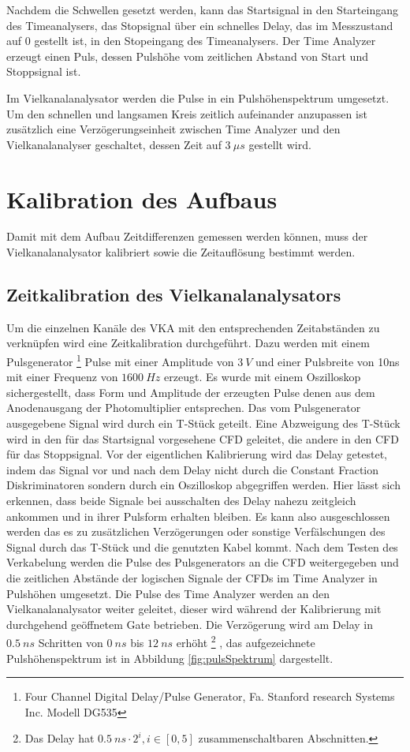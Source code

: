 \documentclass[a4paper,12pt]{article}
\begin{document}
Nachdem die Schwellen gesetzt werden, kann das Startsignal in den Starteingang des Timeanalysers, das Stopsignal über ein schnelles Delay, das im Messzustand auf 0 gestellt ist, in den Stopeingang des Timeanalysers.
Der Time Analyzer erzeugt einen Puls, dessen Pulshöhe vom zeitlichen Abstand von Start und Stoppsignal ist.

Im Vielkanalanalysator werden die Pulse in ein Pulshöhenspektrum umgesetzt.
Um den schnellen und langsamen Kreis zeitlich aufeinander 
anzupassen ist zusätzlich eine Verzögerungseinheit zwischen Time Analyzer und den Vielkanalanalyser geschaltet, dessen Zeit auf $\SI{3}{μs}$ gestellt wird.

\section{Kalibration des Aufbaus}
Damit mit dem Aufbau Zeitdifferenzen gemessen werden können, muss der Vielkanalanalysator kalibriert
sowie die Zeitauflösung bestimmt werden.
\subsection{Zeitkalibration des Vielkanalanalysators}
Um die einzelnen Kanäle des VKA mit den entsprechenden Zeitabständen zu verknüpfen wird eine Zeitkalibration durchgeführt. Dazu werden
mit einem Pulsgenerator
\footnote{Four Channel Digital Delay/Pulse Generator, Fa. Stanford research Systems Inc. Modell DG535}
Pulse mit einer Amplitude von $\SI{3}{V}$ und einer Pulsbreite von 10ns mit
einer Frequenz von $\SI{1600}{Hz}$ erzeugt.
Es wurde mit einem Oszilloskop sichergestellt, dass Form und Amplitude der erzeugten Pulse denen aus dem Anodenausgang der Photomultiplier
entsprechen. Das vom Pulsgenerator ausgegebene Signal wird durch ein T-Stück geteilt. Eine Abzweigung des T-Stück wird in den für das Startsignal vorgesehene
CFD geleitet, die andere in den CFD für das Stoppsignal. Vor der eigentlichen Kalibrierung wird das Delay getestet, indem
das Signal vor und nach dem Delay nicht durch die Constant Fraction Diskriminatoren sondern durch ein Oszilloskop abgegriffen werden. Hier lässt sich erkennen,
dass beide Signale bei ausschalten des Delay nahezu zeitgleich ankommen und in ihrer Pulsform erhalten bleiben. Es kann also ausgeschlossen werden das es zu
zusätzlichen Verzögerungen oder sonstige Verfälschungen des Signal durch das T-Stück und die genutzten Kabel kommt.
Nach dem Testen des Verkabelung werden die Pulse des Pulsgenerators an die CFD weitergegeben und die zeitlichen Abstände der logischen Signale der CFDs im Time Analyzer
in Pulshöhen umgesetzt. Die Pulse des Time Analyzer werden an den Vielkanalanalysator weiter geleitet, dieser wird während der Kalibrierung mit
durchgehend geöffnetem Gate betrieben. Die Verzögerung wird am Delay in $\SI{0.5}{ns}$ Schritten von $\SI{0}{ns}$ bis $\SI{12}{ns}$ erhöht
\footnote{Das Delay hat $\SI{0.5}{ns}\cdot 2^{i}, i\in[0,5]$ zusammenschaltbaren
Abschnitten.}
, das aufgezeichnete Pulshöhenspektrum
ist in Abbildung \ref{fig:pulsSpektrum} dargestellt.
\end{document}
